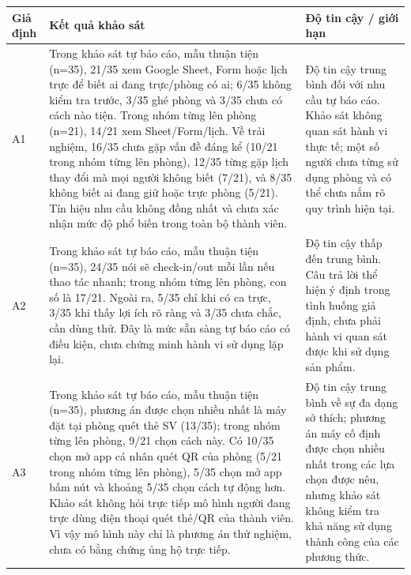 {\centering
\begin{tabularx}{0.94\textwidth}{|>{\raggedright\arraybackslash}p{}|>{\raggedright\arraybackslash}p{}|X|}
\hline
\textbf{Giả định} & \textbf{Kết quả khảo sát} & \textbf{Độ tin cậy / giới hạn} \\ \hline
A1 & Trong khảo sát tự báo cáo, mẫu thuận tiện (n=35), 21/35 xem Google Sheet, Form hoặc lịch trực để biết ai đang trực/phòng có ai; 6/35 không kiểm tra trước, 3/35 ghé phòng và 3/35 chưa có cách nào tiện. Trong nhóm từng lên phòng (n=21), 14/21 xem Sheet/Form/lịch. Về trải nghiệm, 16/35 chưa gặp vấn đề đáng kể (10/21 trong nhóm từng lên phòng), 12/35 từng gặp lịch thay đổi mà mọi người không biết (7/21), và 8/35 không biết ai đang giữ hoặc trực phòng (5/21). Tín hiệu nhu cầu không đồng nhất và chưa xác nhận mức độ phổ biến trong toàn bộ thành viên. & Độ tin cậy trung bình đối với nhu cầu tự báo cáo. Khảo sát không quan sát hành vi thực tế; một số người chưa từng sử dụng phòng và có thể chưa nắm rõ quy trình hiện tại. \\ \hline
A2 & Trong khảo sát tự báo cáo, mẫu thuận tiện (n=35), 24/35 nói sẽ check-in/out mỗi lần nếu thao tác nhanh; trong nhóm từng lên phòng, con số là 17/21. Ngoài ra, 5/35 chỉ khi có ca trực, 3/35 khi thấy lợi ích rõ ràng và 3/35 chưa chắc, cần dùng thử. Đây là mức sẵn sàng tự báo cáo có điều kiện, chưa chứng minh hành vi sử dụng lặp lại. & Độ tin cậy thấp đến trung bình. Câu trả lời thể hiện ý định trong tình huống giả định, chưa phải hành vi quan sát được khi sử dụng sản phẩm. \\ \hline
A3 & Trong khảo sát tự báo cáo, mẫu thuận tiện (n=35), phương án được chọn nhiều nhất là máy đặt tại phòng quét thẻ SV (13/35); trong nhóm từng lên phòng, 9/21 chọn cách này. Có 10/35 chọn mở app cá nhân quét QR của phòng (5/21 trong nhóm từng lên phòng), 5/35 chọn mở app bấm nút và khoảng 5/35 chọn cách tự động hơn. Khảo sát không hỏi trực tiếp mô hình người đang trực dùng điện thoại quét thẻ/QR của thành viên. Vì vậy mô hình này chỉ là phương án thử nghiệm, chưa có bằng chứng ủng hộ trực tiếp. & Độ tin cậy trung bình về sự đa dạng sở thích; phương án máy cố định được chọn nhiều nhất trong các lựa chọn được nêu, nhưng khảo sát không kiểm tra khả năng sử dụng thành công của các phương thức. \\ \hline
\end{tabularx}\par}
\clearpage
